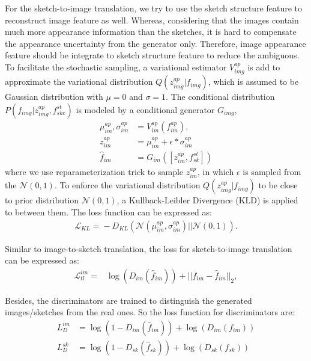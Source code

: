 \documentclass[10pt,twocolumn,letterpaper]{article}
\begin{document}
For the sketch-to-image translation, we try to use the sketch structure feature to reconstruct image feature as well. 
Whereas, considering that the images contain much more appearance information than the sketches, it is hard to compensate the appearance uncertainty from the generator only. 
Therefore, image appearance feature should be integrate to sketch structure feature to reduce the ambiguous. 
To facilitate the stochastic sampling, a variational estimator $V_{img}^{ap}$ is add to approximate the variational distribution $Q(z_{img}^{ap}|f_{img})$, which is assumed to be Gaussian distribution with $\mu=0$ and $\sigma=1$. The conditional distribution $P(f_{img}|z_{img}^{ap}, f_{ske}^{st})$ is modeled by a conditional generator $G_{img}$,
\begin{align}
    \mu_{im}^{ap}, \sigma_{im}^{ap} &= V_{im}^{ap}(f_{im}^{ap}), \label{eq:8} \\
    z_{im}^{ap} &= \mu_{im}^{ap} + \epsilon * \sigma_{im}^{ap} \label{eq:9} \\
    \hat{f}_{im} &= G_{im}([z_{im}^{ap}, f_{sk}^{st}])
\end{align}
where we use reparameterization trick \cite{kingma2013auto} to sample $z_{im}^{ap}$, in which $\epsilon$ is sampled from the $\mathcal{N}(0,1)$.
To enforce the variational distribution $Q(z_{img}^{ap}|f_{img})$ to be close to prior distribution $\mathcal{N}(0, 1)$, a Kullback-Leibler Divergence (KLD) is applied to between them. The loss function can be expressed as:
\begin{align}
    \mathcal{L}_{KL} = \!-\!D_{KL}(\mathcal{N}(\mu_{im}^{ap}, \sigma_{im}^{ap}) || \mathcal{N}(0, 1)).
\end{align}

Similar to image-to-sketch translation, the loss for sketch-to-image translation can be expressed as: 
\begin{align}
    \mathcal{L}_{tl}^{im} =& \log(D_{im}(\hat{f}_{im})) \!+\! ||f_{im}\!-\!\hat{f}_{im}||_2,
\end{align}

Besides, the discriminators are trained to distinguish the generated images/sketches from the real ones. So the loss function for discriminators are:
\begin{align}
    L_{D}^{im} &= \log(1\!-\!D_{im}(\hat{f}_{im})) \!+\! \log(D_{im}(f_{im})) \\
    L_{D}^{sk} &= \log(1\!-\!D_{sk}(\hat{f}_{sk})) \!+\! \log(D_{sk}(f_{sk}))
\end{align}
\end{document}
